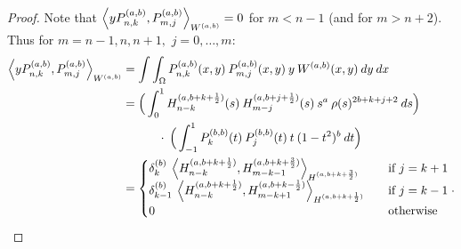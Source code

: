 \documentclass[11pt, oneside]{article}   	%
\newcommand{\half}{\frac{1}{2}}
\newcommand{\Pnkab}{P_{n,k}^{(a,b)}}
\newcommand{\Wab}{{W^{(a,b)}}}
\newcommand{\Pmjab}{P_{m,j}^{(a,b)}}
\begin{document}
\begin{proof}
Note that \(\ip<y \Pnkab, P_{m,j}^{(a,b)}>_\Wab = 0\) for \(m < n-1\) (and for \(m > n+2\)). Thus for \(m = n-1, n, n+1,\) \(j = 0,\dots,m:\)
\begin{align}
\ip<y \Pnkab, P_{m,j}^{(a,b)}>_\Wab &= \int \int_\Omega \Pnkab(x,y) \: \Pmjab(x,y) \: y \: \Wab(x,y) \: dy \: dx \\
&= \Big( \int^1_0 H_{n-k}^{(a, b+k+\half)}(s) \: H_{m-j}^{(a, b+j+\half)}(s) \: s^a \: \rho(s)^{2b+k+j+2} \: ds \Big) \nonumber \\
& \quad \quad \quad\cdot \: \Big( \int^1_{-1} P_k^{(b,b)}(t) \: P_j^{(b,b)}(t) \: t \: (1-t^2)^b \: dt \Big) \\
&= \begin{cases}
    	\delta_k^{(b)} \: \ip<H_{n-k}^{(a, b+k+\half)}, H_{m-k-1}^{(a, b+k+\frac{3}{2})}>_{H^{(a, b+k+\frac{3}{2})}} \quad& \text{if } j = k+1 \\
	\delta_{k-1}^{(b)} \: \ip<H_{n-k}^{(a, b+k+\half)}, H_{m-k+1}^{(a, b+k-\half)}>_{H^{(a, b+k+\half)}} \quad& \text{if } j = k-1 \\
	0 & \text{otherwise}
      \end{cases}.
\end{align}

\end{proof}
\end{document}
